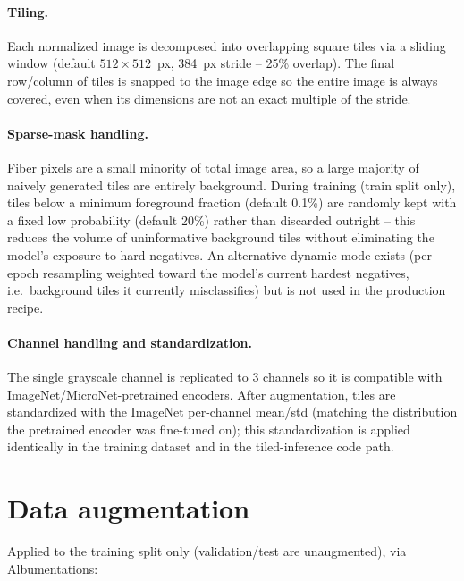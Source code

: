 \documentclass[11pt]{article}
\begin{document}
\paragraph{Tiling.}
Each normalized image is decomposed into overlapping square tiles via a
sliding window (default $512\times512$~px, 384~px stride -- 25\% overlap).
The final row/column of tiles is snapped to the image edge so the entire
image is always covered, even when its dimensions are not an exact multiple
of the stride.

\paragraph{Sparse-mask handling.}
Fiber pixels are a small minority of total image area, so a large majority
of naively generated tiles are entirely background. During training (train
split only), tiles below a minimum foreground fraction (default 0.1\%) are
randomly kept with a fixed low probability (default 20\%) rather than
discarded outright -- this reduces the volume of uninformative background
tiles without eliminating the model's exposure to hard negatives. An
alternative dynamic mode exists (per-epoch resampling weighted toward the
model's current hardest negatives, i.e.\ background tiles it currently
misclassifies) but is not used in the production recipe.

\paragraph{Channel handling and standardization.}
The single grayscale channel is replicated to 3 channels so it is compatible
with ImageNet/MicroNet-pretrained encoders. After augmentation, tiles are
standardized with the ImageNet per-channel mean/std (matching the
distribution the pretrained encoder was fine-tuned on); this standardization
is applied identically in the training dataset and in the tiled-inference
code path.

\section{Data augmentation}

Applied to the training split only (validation/test are unaugmented), via
Albumentations:
\end{document}

